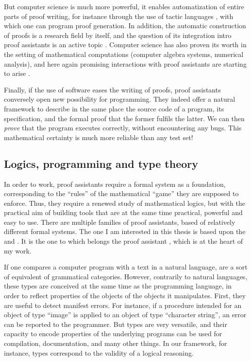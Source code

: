 But computer science is much more powerful, it enables automatization of entire parts of
proof writing, for instance through the use of tactic languages ,
with which one can program proof generation.
In addition, the automatic construction of proofs is a research field by itself,
and the question of its integration intro proof assistants is an active topic
. Computer science has also proven its worth in the
setting of mathematical computations (computer algebra systems, numerical analysis),
and here again promising interactions with proof assistants are starting to arise
.

Finally, if the use of software eases the writing of proofs, proof assistants conversely
open new possibility for programming. They indeed offer a natural framework to describe in
the same place the source code of a program, its specification, and the formal proof that the
former fulfils the latter. We can then \emph{prove} that the program executes correctly,
without encountering any bugs.
This mathematical certainty is much more reliable than any test set!

\subsection{Logics, programming and type theory}

In order to work, proof assistants require a formal system as a foundation, corresponding to
the “rules” of the mathematical “game” they are supposed to enforce.
Thus, they require a renewed study of mathematical logics, but with the practical aim of
building tools that are at the same time practical, powerful and easy to use.
There are multiple families of proof assistants, based of relatively different formal systems.
The one I am interested in this thesis is based upon the 
and . It is the one to which belongs
the proof assistant , which is at the heart of my work.

If one compares a computer program with a text in a natural language, 
are a sort of equivalent of grammatical categories. However, contrarily to natural
languages, these types are conceived at the same time as the programming language, in order
to reflect properties of the objects of the objects it manipulates.
First, they are useful to detect manifest errors. For instance, if a procedure
intended for an object of type “image” is applied to an object of type “character string”,
an error can be reported to the programmer.%
But types are very versatile, and their capacity to encode properties of the underlying
programs can be used for compilation, documentation, and many other things. In our
framework, for instance, types correspond to the validity of a logical reasoning.

